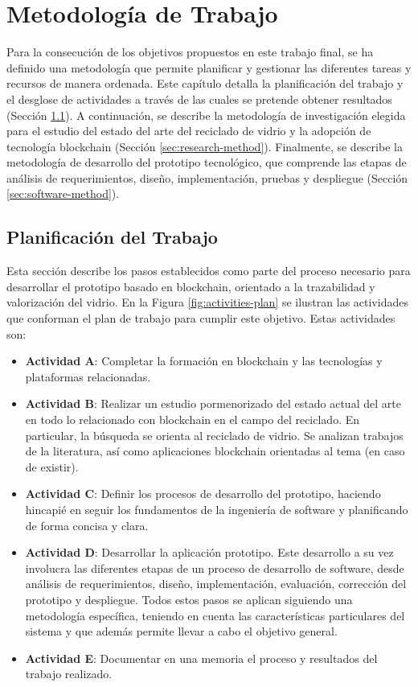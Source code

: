 \chapter[Metodología de Trabajo]{Metodología de Trabajo}
\label{cp:methodology}

\parindent0pt

Para la consecución de los objetivos propuestos en este trabajo final, se ha definido una metodología que permite planificar y gestionar las diferentes tareas y recursos de manera ordenada.
Este capítulo detalla la planificación del trabajo y el desglose de actividades a través de las cuales se pretende obtener resultados (Sección \ref{sec:thesis-plan}).
A continuación, se describe la metodología de investigación elegida para el estudio del estado del arte del reciclado de vidrio y la adopción de tecnología blockchain (Sección \ref{sec:research-method}).
Finalmente, se describe la metodología de desarrollo del prototipo tecnológico, que comprende las etapas de análisis de requerimientos, diseño, implementación, pruebas y despliegue (Sección \ref{sec:software-method}).

\section{Planificación del Trabajo}
\label{sec:thesis-plan}

Esta sección describe los pasos establecidos como parte del proceso necesario para desarrollar el prototipo basado en blockchain, orientado a la trazabilidad y valorización del vidrio. En la Figura \ref{fig:activities-plan} se ilustran las actividades que conforman el plan de trabajo para cumplir este objetivo. Estas actividades son:

\begin{itemize}
	\item \textbf{Actividad A}: Completar la formación en blockchain y las tecnologías y plataformas relacionadas.
	\item \textbf{Actividad B}: Realizar un estudio pormenorizado del estado actual del arte en todo lo relacionado con blockchain en el campo del reciclado. En particular, la búsqueda se orienta al reciclado de vidrio. Se analizan trabajos de la literatura, así como aplicaciones blockchain orientadas al tema (en caso de existir).
	\item \textbf{Actividad C}: Definir los procesos de desarrollo del prototipo, haciendo hincapié en seguir los fundamentos de la ingeniería de software y planificando de forma concisa y clara.
	\item \textbf{Actividad D}: Desarrollar la aplicación prototipo. Este desarrollo a su vez involucra las diferentes etapas de un proceso de desarrollo de software, desde análisis de requerimientos, diseño, implementación, evaluación, corrección del prototipo y despliegue. Todos estos pasos se aplican siguiendo una metodología específica, teniendo en cuenta las características particulares del sistema y que además permite llevar a cabo el objetivo general.
	\item \textbf{Actividad E}: Documentar en una memoria el proceso y resultados del trabajo realizado.
\end{itemize}

